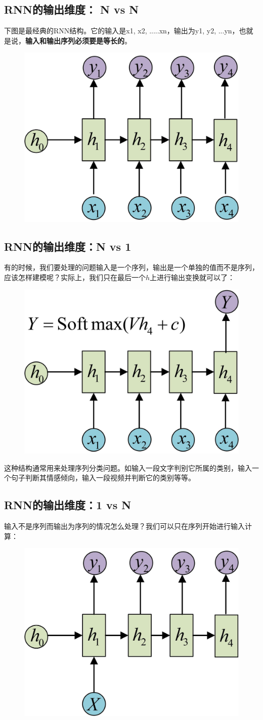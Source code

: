 \documentclass[12pt]{article}
\begin{document}
\subsection{RNN的输出维度： N vs N}
下图是最经典的RNN结构。它的输入是x1, x2, .....xn，输出为y1, y2, ...yn，也就是说，\textbf{输入和输出序列必须要是等长的}。
\begin{figure}[H]
    \centering
    \includegraphics[width=.3\textwidth]{fig/RNN_Classic_Output_N_to_N.jpg}
\end{figure}

\subsection{RNN的输出维度：N vs 1}
有的时候，我们要处理的问题输入是一个序列，输出是一个单独的值而不是序列，应该怎样建模呢？实际上，我们只在最后一个$h$上进行输出变换就可以了：
\begin{figure}[H]
    \centering
    \includegraphics[width=.3\textwidth]{fig/RNN_Classic_Output_N_to_1.jpg}
\end{figure}

这种结构通常用来处理序列分类问题。如输入一段文字判别它所属的类别，输入一个句子判断其情感倾向，输入一段视频并判断它的类别等等。

\subsection{RNN的输出维度：1 vs N}
输入不是序列而输出为序列的情况怎么处理？我们可以只在序列开始进行输入计算：
\begin{figure}[H]
    \centering
    \includegraphics[width=.3\textwidth]{fig/RNN_Classic_Output_1_to_N.jpg}
\end{figure}
\end{document}
